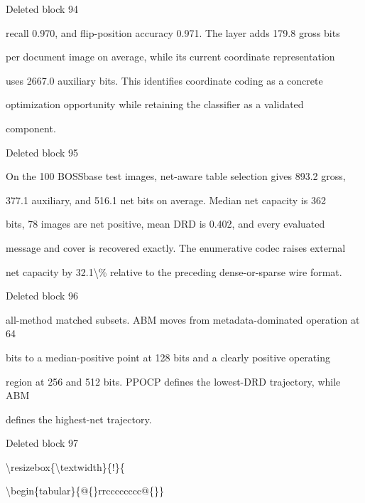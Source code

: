\documentclass[a4paper,fleqn]{cas-dc}
\newenvironment{RevisionDeletion}{%
  \par\begingroup\color{revisionred}\footnotesize\ttfamily
  \setlength{\parindent}{0pt}\setlength{\parskip}{1pt}\obeyspaces
}{\par\endgroup}
\begin{document}
\begin{RevisionDeletion}
Deleted block 94\par
recall 0.970, and flip-position accuracy 0.971. The layer adds 179.8 gross bits\par
per document image on average, while its current coordinate representation\par
uses 2667.0 auxiliary bits. This identifies coordinate coding as a concrete\par
optimization opportunity while retaining the classifier as a validated\par
component.\par
\end{RevisionDeletion}

\begin{RevisionDeletion}
Deleted block 95\par
On the 100 BOSSbase test images, net-aware table selection gives 893.2 gross,\par
377.1 auxiliary, and 516.1 net bits on average. Median net capacity is 362\par
bits, 78 images are net positive, mean DRD is 0.402, and every evaluated\par
message and cover is recovered exactly. The enumerative codec raises external\par
net capacity by 32.1\textbackslash{}\% relative to the preceding dense-or-sparse wire format.\par
\end{RevisionDeletion}

\begin{RevisionDeletion}
Deleted block 96\par
all-method matched subsets. ABM moves from metadata-dominated operation at 64\par
bits to a median-positive point at 128 bits and a clearly positive operating\par
region at 256 and 512 bits. PPOCP defines the lowest-DRD trajectory, while ABM\par
defines the highest-net trajectory.\par
\end{RevisionDeletion}

\begin{RevisionDeletion}
Deleted block 97\par
\textbackslash{}resizebox\{\textbackslash{}textwidth\}\{!\}\{\par
\textbackslash{}begin\{tabular\}\{@\{\}rrcccccccc@\{\}\}\par
\end{RevisionDeletion}
\end{document}
